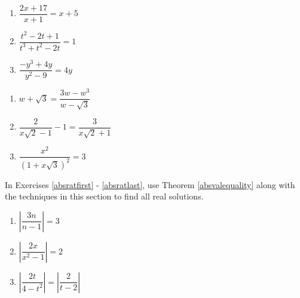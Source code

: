 \documentclass{ximera}
\begin{document}
\begin{multicols}{3}
\begin{enumerate}
\setcounter{enumi}{\value{HW}}


\item $\dfrac{2x + 17}{x + 1} = x + 5$
\item $\dfrac{t^{2} - 2t + 1}{t^{3} + t^{2} - 2t} = 1$
\item $\dfrac{-y^{3} + 4y}{y^{2} - 9} = 4y$  

\setcounter{HW}{\value{enumi}}
\end{enumerate}
\end{multicols}

\begin{multicols}{3}
\begin{enumerate}
\setcounter{enumi}{\value{HW}}


\item $w + \sqrt{3} = \dfrac{3w - w^3}{w - \sqrt{3}}$
\item $\dfrac{2}{x\sqrt{2} - 1}  - 1 = \dfrac{3}{x \sqrt{2} + 1}$
\item $\dfrac{x^2}{(1 + x\sqrt{3})^2} = 3$ \label{rateqnlast}

\setcounter{HW}{\value{enumi}}
\end{enumerate}
\end{multicols}



In Exercises \ref{absratfirst} - \ref{absratlast}, use Theorem \ref{absvalequality} along with the techniques in this section to find all real solutions.

\begin{multicols}{3}
\begin{enumerate}
\setcounter{enumi}{\value{HW}}

\item $\left|\dfrac{3n}{n-1}  \right| = 3$ \label{absratfirst}
\item $\left| \dfrac{2x}{x^2-1}\right| = 2$
\item $\left| \dfrac{2t}{4-t^2}\right| = \left|\dfrac{2}{t-2}\right|$ \label{absratlast}

\setcounter{HW}{\value{enumi}}
\end{enumerate}
\end{multicols}
\end{document}
